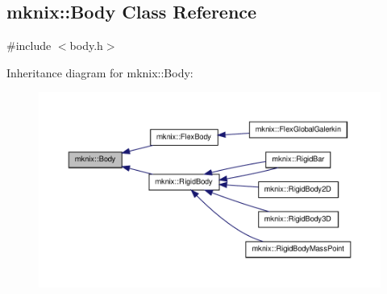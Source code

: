 \hypertarget{classmknix_1_1_body}{\subsection{mknix\-:\-:Body Class Reference}
\label{classmknix_1_1_body}
}


{\ttfamily \#include $<$body.\-h$>$}



Inheritance diagram for mknix\-:\-:Body\-:\nopagebreak
\begin{figure}[H]
\begin{center}
\leavevmode
\includegraphics[width=350pt]{d9/d1c/classmknix_1_1_body__inherit__graph}
\end{center}
\end{figure}
